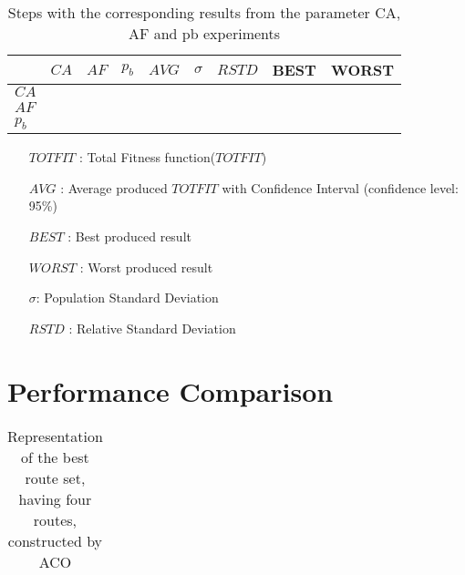 \begin{sidewaystable}
    \begin{tabular}{|l|l|l|c||c|c|c|c|c|}
    \hline
    ~ & $CA$ & $AF$ & $p_b$ & $AVG$ & $\sigma$ & $RSTD$ & BEST & WORST \\
    \hline
    $CA$ \\

    \hline
    $AF$ \\
 
    \hline
    $p_b$ \\
  
    \hline
    \end{tabular}
    \caption {Steps with the corresponding results from the parameter CA, AF and pb experiments}
    \tiny
    \begin{itemize}[noitemsep]
    \item[$TOTFIT$ :] Total Fitness function($TOTFIT$)
    \item[$AVG$ :] Average produced $TOTFIT$ with Confidence Interval (confidence level: 95\%)
    \item[$BEST$ :] Best produced result
    \item[$WORST$ :] Worst produced result
    \item[$\sigma$:] Population Standard Deviation 
    \item[$RSTD$ :] Relative Standard Deviation 
    \end{itemize}
    \label{table:pm2}
\end{sidewaystable}


\section{Performance Comparison}

\begin{table}[H]
    \centering
    \begin{tabular}{|l|llllllll|}
    \hline
    \hline
    \end{tabular}
    \caption {Representation of the best route set, having four routes, constructed by ACO}
    \label{table:performanceComparison_bestRouteSet4_ACO}
\end{table}

